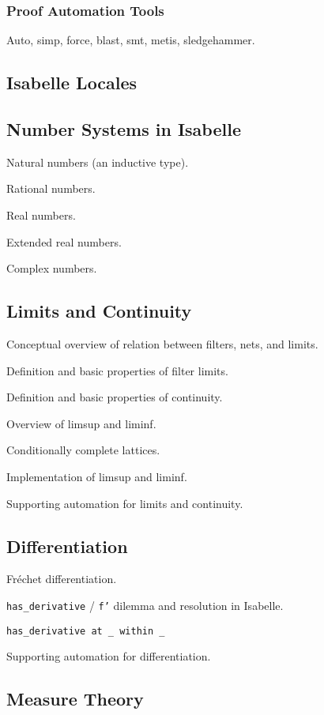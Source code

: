 \documentclass{amsart}
\theoremstyle{definition}
\theoremstyle{remark}
\begin{document}
\subsubsection{Proof Automation Tools}

Auto, simp, force, blast, smt, metis, sledgehammer.

\subsection{Isabelle Locales}

\subsection{Number Systems in Isabelle}

Natural numbers (an inductive type).

Rational numbers.

Real numbers.

Extended real numbers.

Complex numbers.

\subsection{Limits and Continuity}

Conceptual overview of relation between filters, nets, and limits.

Definition and basic properties of filter limits.

Definition and basic properties of continuity.

Overview of limsup and liminf.

Conditionally complete lattices.

Implementation of limsup and liminf.

Supporting automation for limits and continuity.

\subsection{Differentiation}

Fr\'echet differentiation.

\texttt{has\_derivative} / \texttt{f'} dilemma and resolution in Isabelle.

\texttt{has\_derivative at \_ within \_}

Supporting automation for differentiation.

\subsection{Measure Theory}
\end{document}
